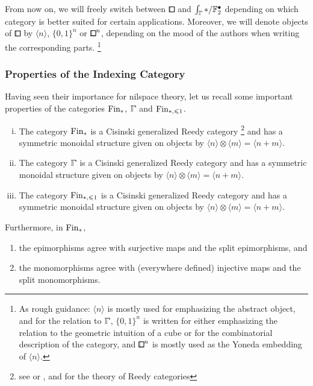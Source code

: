 From now on, we will freely switch between $\bbox$ and $\int_{\bbGamma} \ast/\F_2^\bullet$ depending on which category is better suited for certain applications.
Moreover, we will denote objects of $\bbox$ by $\langle n\rangle$, $\{0,1\}^n$ or ${\bbox}^n$,
depending on the mood of the authors when writing the corresponding parts.%
\footnote{As rough guidance: $\langle n\rangle$ is mostly used for emphasizing the abstract object,
and for the relation to $\bbGamma$,
$\{0,1\}^n$ is written for either emphasizing the relation to the geometric intuition of a cube
or for the combinatorial description of the category,
and $\bbox^n$ is mostly used as the Yoneda embedding of $\langle n\rangle$.}


\subsubsection{Properties of the Indexing Category}

Having seen their importance for nilspace theory,
let us recall some important properties of the categories $\mathrm{Fin}_\ast$, $\bbGamma$ and $\mathrm{Fin}_{\ast,\leqslant 1}$.

\begin{lemma}\label{lem:basic-prop-indexcat}
\begin{enumerate}[(i)]
    \item The category $\mathrm{Fin}_\ast$ is a Cisinski generalized Reedy category%
    \footnote{see \cite[Def 8.1.1]{Cisinski2006} or \cite{Berger2010}, and \cite{Riehl2014,Riehl2017} for the theory of Reedy categories}
        and has a symmetric monoidal structure given on objects by $\langle n\rangle\otimes\langle m\rangle = \langle n+m\rangle$.
    \item The category $\bbGamma$ is a Cisinski generalized Reedy category and has a symmetric monoidal structure given on objects by $\langle n\rangle\otimes\langle m\rangle = \langle n+m\rangle$.
    \item The category $\mathrm{Fin}_{\ast,\leqslant 1}$ is a Cisinski generalized Reedy category and has a symmetric monoidal structure given on objects by $\langle n\rangle\otimes\langle m\rangle = \langle n+m\rangle$.
\end{enumerate}
\noindent
Furthermore, in $\mathrm{Fin}_\ast$,
\begin{enumerate}[(1)]
    \item the epimorphisms agree with surjective maps and the split epimorphisms, and
    \item the monomorphisms agree with (everywhere defined) injective maps and the split monomorphisms.
\end{enumerate}
\end{lemma}

